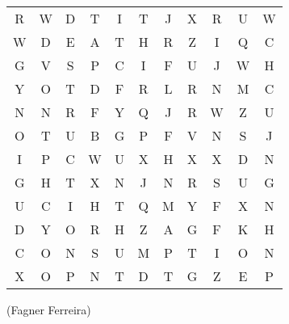 \begin{flushright}
    \begin{spacing}{1.0}
        \selectfont
        \begin{NiceTabularX}{\textwidth}{*{11}{c}}
            R & W & D & T & I & T & J & X & R & U & W \\
            W & D & E & A & T & H & R & Z & I & Q & C \\
            G & V & S & P & C & I & F & U & J & W & H \\
            Y & O & T & D & F & R & L & R & N & M & C \\
            N & N & R & F & Y & Q & J & R & W & Z & U \\
            O & T & U & B & G & P & F & V & N & S & J \\
            I & P & C & W & U & X & H & X & X & D & N \\
            G & H & T & X & N & J & N & R & S & U & G \\
            U & C & I & H & T & Q & M & Y & F & X & N \\
            D & Y & O & R & H & Z & A & G & F & K & H \\
            C & O & N & S & U & M & P & T & I & O & N \\
            X & O & P & N & T & D & T & G & Z & E & P \\
        \end{NiceTabularX}
    \end{spacing}
    \vspace{1.5em}
    (Fagner Ferreira)
\end{flushright}
\pagebreak
